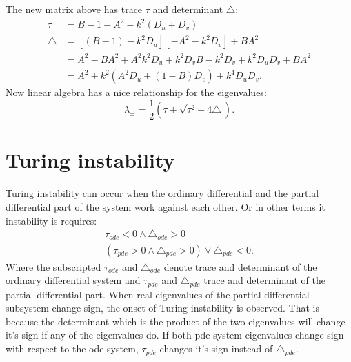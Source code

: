 The new matrix above has trace $\tau$ and determinant $\triangle$:
\begin{align}
\tau &= B - 1 - A^2 - k^2(D_u + D_v) \\
\triangle &= [(B-1) - k^2 D_u ][-A^2 - k^2D_v] + BA^2 \\
		  &= A^2 - BA^2 + A^2k^2D_u + k^2D_vB - k^2 D_v + k^2 D_u D_v + BA^2 \\
		  &= A^2 + k^2(A^2 D_u + (1 - B)D_v ) + k^4 D_u D_v.
\end{align}
Now linear algebra has a nice relationship for the eigenvalues:
\begin{equation}
\lambda_\pm = \frac{1}{2}(\tau \pm \sqrt{\tau^2 - 4\triangle}).
\end{equation}
\section{Turing instability}
Turing instability can occur when the ordinary differential and the partial differential part of the system work against each other. Or in other terms it instability is requires:
\begin{align}
\tau_{ode} < 0 \wedge \triangle_{ode} > 0 \\
(\tau_{pde} > 0 \wedge \triangle_{pde} > 0) \vee \triangle_{pde} < 0.
\end{align}
Where the subscripted $\tau_{ode}$ and $\triangle_{ode}$ denote trace and determinant of the ordinary differential system and $\tau_{pde}$ and $\triangle_{pde}$ trace and determinant of the partial differential part. When real eigenvalues of the partial differential subsystem change sign, the onset of Turing instability is observed. That is because the determinant which is the product of the two eigenvalues will change it's sign if any of the eigenvalues do. If both pde system eigenvalues change sign with respect to the ode system, $\tau_{pde}$ changes it's sign instead of $\triangle_{pde}$.

